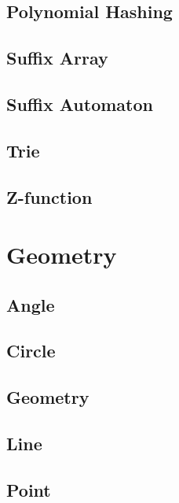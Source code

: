 \subsection{Polynomial Hashing}
\raggedbottom
\subsection{Suffix Array}
\raggedbottom
\subsection{Suffix Automaton}
\raggedbottom
\subsection{Trie}
\raggedbottom
\subsection{Z-function}
\raggedbottom


\section{Geometry}
\subsection{Angle}
\raggedbottom
\subsection{Circle}
\raggedbottom
\subsection{Geometry}
\raggedbottom
\subsection{Line}
\raggedbottom
\subsection{Point}
\raggedbottom

